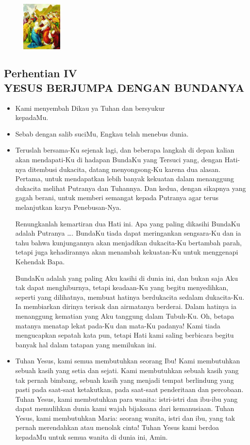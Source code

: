 \documentclass[a5paper,headsepline,titlepage,10pt,nnormalheadings,DIVcalc]{scrbook}
\newcommand{\BU}[1]{\begin{itemize} \item[U:] #1 \end{itemize}}
\newcommand{\BP}[1]{\begin{itemize} \item[P:] #1 \end{itemize}}
\newcommand{\kamiMenyembah}{\BP{ Kami menyembah Dikau ya Tuhan dan bersyukur\\kepadaMu.}
\BU{ Sebab dengan salib suciMu, Engkau telah menebus dunia.}
}
\begin{document}
\begin{figure}
\includegraphics[width=2cm]{jalansalib_files/04_small.jpg}
\end{figure}
\subsection*{Perhentian IV\\
YESUS BERJUMPA DENGAN BUNDANYA}

\kamiMenyembah
\BP{Teruslah bersama-Ku sejenak lagi, dan beberapa langkah di depan kalian akan mendapati-Ku di hadapan BundaKu yang Tersuci yang, dengan Hati-nya ditembusi dukacita, datang menyongsong-Ku karena dua alasan. Pertama, untuk mendapatkan lebih banyak kekuatan dalam menanggung dukacita melihat Putranya dan Tuhannya. Dan kedua, dengan sikapnya yang gagah berani, untuk memberi semangat kepada Putranya agar terus melanjutkan karya Penebusan-Nya.

Renungkanlah kemartiran dua Hati ini. Apa yang paling dikasihi BundaKu adalah Putranya \dots . BundaKu tiada dapat meringankan sengsara-Ku dan ia tahu bahwa kunjungannya akan menjadikan dukacita-Ku bertambah parah, tetapi juga kehadirannya akan menambah kekuatan-Ku untuk menggenapi Kehendak Bapa.

BundaKu adalah yang paling Aku kasihi di dunia ini, dan bukan saja Aku tak dapat menghiburnya, tetapi keadaan-Ku yang begitu menyedihkan, seperti yang dilihatnya, membuat hatinya berdukacita sedalam dukacita-Ku. Ia membiarkan dirinya terisak dan airmatanya berderai. Dalam hatinya ia menanggung kematian yang Aku tanggung dalam Tubuh-Ku. Oh, betapa matanya menatap lekat pada-Ku dan mata-Ku padanya! Kami tiada mengucapkan sepatah kata pun, tetapi Hati kami saling berbicara begitu banyak hal dalam tatapan yang memilukan ini.}

\BU{Tuhan Yesus, kami semua membutuhkan seorang Ibu! Kami membutuhkan sebuah kasih yang setia dan sejati. Kami membutuhkan sebuah kasih yang tak pernah bimbang, sebuah kasih yang menjadi tempat berlindung yang pasti pada saat-saat ketakutkan, pada saat-saat penderitaan dan percobaan. Tuhan Yesus, kami membutuhkan para wanita: istri-istri dan ibu-ibu yang dapat memulihkan dunia kami wajah bijaksana dari kemanusiaan. Tuhan Yesus, kami membutuhkan Maria: seorang wanita, istri dan ibu, yang tak pernah merendahkan atau menolak cinta! Tuhan Yesus kami berdoa kepadaMu untuk semua wanita di dunia ini, Amin.}
\end{document}
